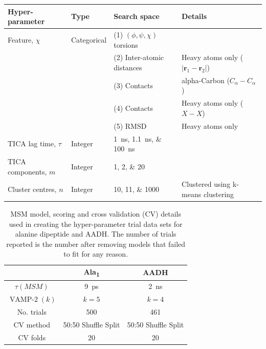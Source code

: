 \begin{table}
    \centering
    \begin{tabularx}{0.9\textwidth}{ |>{\raggedright\arraybackslash}l|l|>{\raggedright\arraybackslash}X| >{\raggedright\arraybackslash}X | } 
    \hline
    \textbf{Hyper-parameter} & \textbf{Type} & \textbf{Search space} & \textbf{Details} \\
     \hline\hline
    Feature, $\chi$ & Categorical & (1) $(\phi, \psi, \chi)$ torsions & \\
    & & (2) Inter-atomic distances & Heavy atoms only ($|\mathbf{r}_{1}-\mathbf{r}_{2}|$) \\
    & & (3) Contacts & alpha-Carbon ($C_{\alpha}-C_{\alpha}$)\\ 
    & & (4) Contacts & Heavy atoms only ($X-X$)\\ 
    & & (5) RMSD &  Heavy atoms only\\ 
    \hline
    TICA lag time, $\tau$ & Integer &\SIlist[list-final-separator = { ... }]{1;1.1;100}{ns} & \\
    \hline
    TICA components, $m$& Integer &\numlist[list-final-separator = { ... }]{1;2;20} & \\
    \hline
    Cluster centres, $n$ & Integer & \numlist[list-final-separator = { ... }]{10;11;1000} &  Clustered using k-means clustering  \\
    
     \hline
    \end{tabularx}
    \label{tab:aadh_searchspace}
\end{table}

\begin{table}
    \centering
    \caption{MSM model, scoring and cross validation (CV) details used in creating the hyper-parameter trial data sets for alanine dipeptide and AADH. The number of trials reported is the number after removing models that failed to fit for any reason.}
    \begin{tabular}{|c|c|c|}
    \hline
    & Ala\textsubscript{1} & AADH \\
    \hline\hline
    $\tau(MSM)$ & \SI{9}{\pico\second} & \SI{2}{\nano\second} \\         
    $\operatorname{VAMP-2}(k)$ & $k=5$ & $k=4$ \\
    No. trials & 500 & 461 \\
    CV method & 50:50 Shuffle Split & 50:50 Shuffle Split \\
    CV folds & 20 & 20 \\
     \hline       
    \end{tabular}
    \label{tab:trial_specs}
\end{table}

